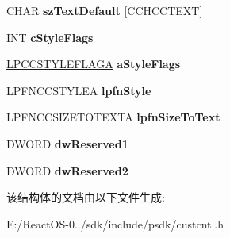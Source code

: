 \begin{DoxyCompactItemize}
C\+H\+AR {\bfseries sz\+Text\+Default} \mbox{[}C\+C\+H\+C\+C\+T\+E\+XT\mbox{]}
\item 
\mbox{\label{structtag_c_c_i_n_f_o_a_a50412de9b2cbaeb362e37be182d8b865}} 
I\+NT {\bfseries c\+Style\+Flags}
\item 
\mbox{\label{structtag_c_c_i_n_f_o_a_a5edf73b199fec59887488328fe8fc2b9}} 
\hyperlink{structtag_c_c_s_t_y_l_e_f_l_a_g_a}{L\+P\+C\+C\+S\+T\+Y\+L\+E\+F\+L\+A\+GA} {\bfseries a\+Style\+Flags}
\item 
\mbox{\label{structtag_c_c_i_n_f_o_a_a5e359fcd28f134d28316c3b3b3fda3cb}} 
L\+P\+F\+N\+C\+C\+S\+T\+Y\+L\+EA {\bfseries lpfn\+Style}
\item 
\mbox{\label{structtag_c_c_i_n_f_o_a_a10cec43b5126eac12e9add8343a0e794}} 
L\+P\+F\+N\+C\+C\+S\+I\+Z\+E\+T\+O\+T\+E\+X\+TA {\bfseries lpfn\+Size\+To\+Text}
\item 
\mbox{\label{structtag_c_c_i_n_f_o_a_a4768b206d3c4972e951adb2057ba5d20}} 
D\+W\+O\+RD {\bfseries dw\+Reserved1}
\item 
\mbox{\label{structtag_c_c_i_n_f_o_a_aa7420baff66e500338cedaf9b1f79b04}} 
D\+W\+O\+RD {\bfseries dw\+Reserved2}
\end{DoxyCompactItemize}


该结构体的文档由以下文件生成\+:\begin{DoxyCompactItemize}
\item 
E\+:/\+React\+O\+S-\/0../sdk/include/psdk/custcntl.\+h\end{DoxyCompactItemize}
